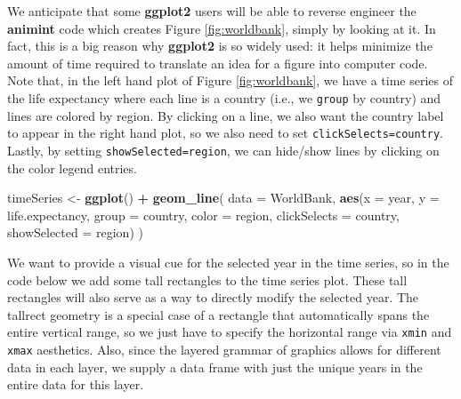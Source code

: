 \documentclass[12pt,]{article}
\newenvironment{Shaded}{\begin{snugshade}}{\end{snugshade}}
\newcommand{\DataTypeTok}[1]{\textcolor[rgb]{0.13,0.29,0.53}{#1}}
\newcommand{\FloatTok}[1]{\textcolor[rgb]{0.00,0.00,0.81}{#1}}
\newcommand{\KeywordTok}[1]{\textcolor[rgb]{0.13,0.29,0.53}{\textbf{#1}}}
\newcommand{\NormalTok}[1]{#1}
\newcommand{\OperatorTok}[1]{\textcolor[rgb]{0.81,0.36,0.00}{\textbf{#1}}}
\newcommand{\StringTok}[1]{\textcolor[rgb]{0.31,0.60,0.02}{#1}}
\theoremstyle{definition}
\theoremstyle{definition}
\theoremstyle{definition}
\theoremstyle{remark}
\begin{document}
We anticipate that some \textbf{ggplot2} users will be able to reverse
engineer the \textbf{animint} code which creates Figure
\ref{fig:worldbank}, simply by looking at it. In fact, this is a big
reason why \textbf{ggplot2} is so widely used: it helps minimize the
amount of time required to translate an idea for a figure into computer
code. Note that, in the left hand plot of Figure \ref{fig:worldbank}, we
have a time series of the life expectancy where each line is a country
(i.e., we \texttt{group} by country) and lines are colored by region. By
clicking on a line, we also want the country label to appear in the
right hand plot, so we also need to set \texttt{clickSelects=country}.
Lastly, by setting \texttt{showSelected=region}, we can hide/show lines
by clicking on the color legend entries.

\begin{Shaded}
\begin{Highlighting}[]
\NormalTok{timeSeries <-}\StringTok{ }\KeywordTok{ggplot}\NormalTok{() }\OperatorTok{+}\StringTok{ }\KeywordTok{geom_line}\NormalTok{(}
  \DataTypeTok{data =}\NormalTok{ WorldBank,}
  \KeywordTok{aes}\NormalTok{(}\DataTypeTok{x =}\NormalTok{ year, }\DataTypeTok{y =}\NormalTok{ life.expectancy,}
      \DataTypeTok{group =}\NormalTok{ country, }\DataTypeTok{color =}\NormalTok{ region,}
      \DataTypeTok{clickSelects =}\NormalTok{ country, }
      \DataTypeTok{showSelected =}\NormalTok{ region)}
\NormalTok{)}
\end{Highlighting}
\end{Shaded}

We want to provide a visual cue for the selected year in the time
series, so in the code below we add some tall rectangles to the time
series plot. These tall rectangles will also serve as a way to directly
modify the selected year. The tallrect geometry is a special case of a
rectangle that automatically spans the entire vertical range, so we just
have to specify the horizontal range via \texttt{xmin} and \texttt{xmax}
aesthetics. Also, since the layered grammar of graphics allows for
different data in each layer, we supply a data frame with just the
unique years in the entire data for this layer.

\begin{Shaded}
\end{Shaded}
\end{document}
